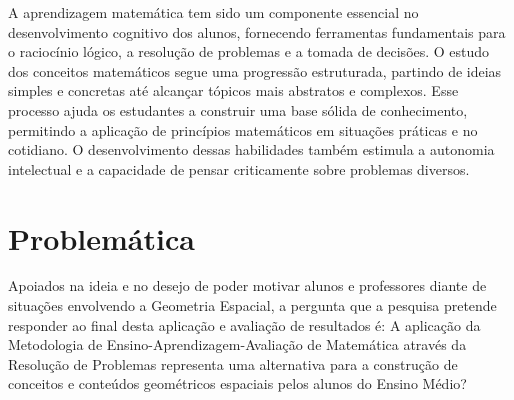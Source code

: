 
A aprendizagem matemática tem sido um componente essencial no desenvolvimento cognitivo dos alunos, fornecendo ferramentas fundamentais para o raciocínio lógico, a resolução de problemas e a tomada de decisões. O estudo dos conceitos matemáticos segue uma progressão estruturada, partindo de ideias simples e concretas até alcançar tópicos mais abstratos e complexos. Esse processo ajuda os estudantes a construir uma base sólida de conhecimento, permitindo a aplicação de princípios matemáticos em situações práticas e no cotidiano. O desenvolvimento dessas habilidades também estimula a autonomia intelectual e a capacidade de pensar criticamente sobre problemas diversos.


\section{Problemática}

Apoiados na ideia e no desejo de poder motivar alunos e professores diante de situações envolvendo a Geometria Espacial, a pergunta que a pesquisa pretende responder ao final desta aplicação e avaliação de resultados é: A aplicação da Metodologia de Ensino-Aprendizagem-Avaliação de Matemática através da Resolução de Problemas representa uma alternativa para a construção de conceitos e conteúdos geométricos espaciais pelos alunos do Ensino Médio?

